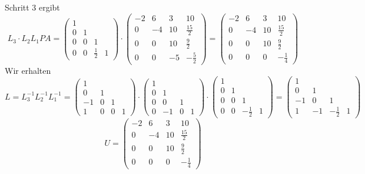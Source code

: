 \documentclass{article}
\theoremstyle{definition}
\begin{document}
 Schritt 3 ergibt
 \[L_3 \cdot L_2L_1PA = \begin{pmatrix}
    1& & &\\
    0&1& &\\
    0&0&1&\\
    0&0&\frac{1}{2}&1 
\end{pmatrix}\cdot \begin{pmatrix}
    -2 & 6 & 3 & 10\\
    0 & -4 & 10 & \frac{15}{2}\\
    0 & 0 & 10 & \frac{9}{2}\\
    0 & 0 & -5 & -\frac{5}{2}
 \end{pmatrix} = \begin{pmatrix}
    -2 & 6 & 3 & 10\\
    0 & -4 & 10 & \frac{15}{2}\\
    0 & 0 & 10 & \frac{9}{2}\\
    0 & 0 & 0 & -\frac{1}{4}
 \end{pmatrix}\]
 Wir erhalten
\[
    L = L_3^{-1}L_2^{-1}L_1^{-1} = 
    \begin{pmatrix}
        1& & &\\
        0&1& &\\
        -1&0&1&\\
        1&0&0&1 
    \end{pmatrix} \cdot \begin{pmatrix}
        1& & &\\
        0&1& &\\
        0&0&1&\\
        0&-1&0&1 
    \end{pmatrix} \cdot 
    \begin{pmatrix}
        1& & &\\
        0&1& &\\
        0&0&1&\\
        0&0&-\frac{1}{2}&1 
    \end{pmatrix} = 
    \begin{pmatrix}
        1& & &\\
        0&1& &\\
        -1&0&1&\\
        1&-1&-\frac{1}{2}&1 
        \end{pmatrix}\]
\[U =
    \begin{pmatrix}
        -2 & 6 & 3 & 10\\
        0 & -4 & 10 & \frac{15}{2}\\
        0 & 0 & 10 & \frac{9}{2}\\
        0 & 0 & 0 & -\frac{1}{4}
     \end{pmatrix}
\]
\end{document}
